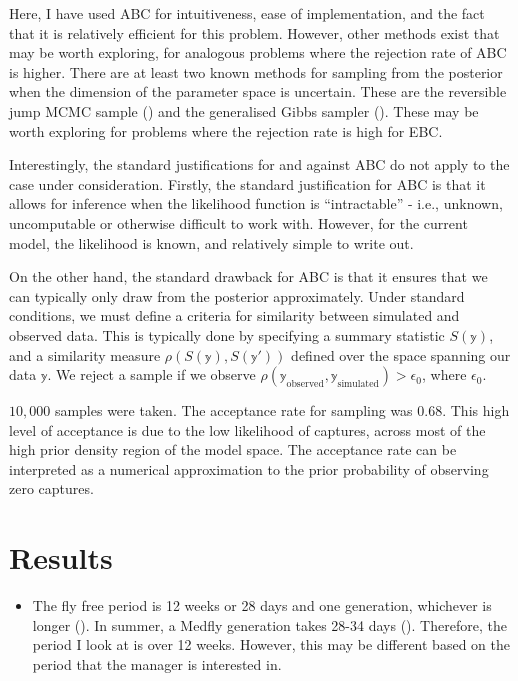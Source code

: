 \documentclass[
  oneside]{book}
\providecommand{\tightlist}{%
  \setlength{\itemsep}{0pt}\setlength{\parskip}{0pt}}
\begin{document}
Here, I have used ABC for intuitiveness, ease of implementation, and the fact that it is relatively efficient for this problem. However, other methods exist that may be worth exploring, for analogous problems where the rejection rate of ABC is higher. There are at least two known methods for sampling from the posterior when the dimension of the parameter space is uncertain. These are the reversible jump MCMC sample (\citet{green1995}) and the generalised Gibbs sampler (\citet{keith2015}). These may be worth exploring for problems where the rejection rate is high for EBC.

Interestingly, the standard justifications for and against ABC do not apply to the case under consideration. Firstly, the standard justification for ABC is that it allows for inference when the likelihood function is ``intractable'' - i.e., unknown, uncomputable or otherwise difficult to work with. However, for the current model, the likelihood is known, and relatively simple to write out.

On the other hand, the standard drawback for ABC is that it ensures that we can typically only draw from the posterior approximately. Under standard conditions, we must define a criteria for similarity between simulated and observed data. This is typically done by specifying a summary statistic \(S(\mathbb y)\), and a similarity measure \(\rho(S(\mathbb y), S(\mathbb y'))\) defined over the space spanning our data \(\mathbb y\). We reject a sample if we observe \(\rho(\mathbb y_{\text{observed}}, \mathbb y_{\text{simulated}} ) > \epsilon_0\), where \(\epsilon_0\).

\(10{,}000\) samples were taken. The acceptance rate for sampling was 0.68. This high level of acceptance is due to the low likelihood of captures, across most of the high prior density region of the model space. The acceptance rate can be interpreted as a numerical approximation to the prior probability of observing zero captures.

\hypertarget{results}{%
\section{Results}\label{results}}

\begin{itemize}
\tightlist
\item
  The fly free period is 12 weeks or 28 days and one generation, whichever is longer (\citet{meats2005}). In summer, a Medfly generation takes 28-34 days (\citet{dpirdwa}). Therefore, the period I look at is over 12 weeks. However, this may be different based on the period that the manager is interested in.
\end{itemize}
\end{document}
